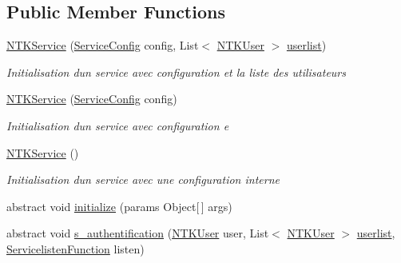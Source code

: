 \subsection*{Public Member Functions}
\begin{DoxyCompactItemize}
\item 
\mbox{\hyperlink{class_n_t_k_1_1_service_1_1_n_t_k_service_ae481738002a4ff9e84a28f900b077283}{N\+T\+K\+Service}} (\mbox{\hyperlink{struct_n_t_k_1_1_service_1_1_service_config}{Service\+Config}} config, List$<$ \mbox{\hyperlink{class_n_t_k_1_1_n_t_k_user}{N\+T\+K\+User}} $>$ \mbox{\hyperlink{class_n_t_k_1_1_service_1_1_n_t_k_service_a14977c798a805fea99802fa40da31aa0}{userlist}})
\begin{DoxyCompactList}\small\item\em Initialisation d\textquotesingle{}un service avec configuration et la liste des utilisateurs \end{DoxyCompactList}\item 
\mbox{\hyperlink{class_n_t_k_1_1_service_1_1_n_t_k_service_ab7f1a9e37216cfea00821caf98829436}{N\+T\+K\+Service}} (\mbox{\hyperlink{struct_n_t_k_1_1_service_1_1_service_config}{Service\+Config}} config)
\begin{DoxyCompactList}\small\item\em Initialisation d\textquotesingle{}un service avec configuration e \end{DoxyCompactList}\item 
\mbox{\hyperlink{class_n_t_k_1_1_service_1_1_n_t_k_service_ae68f898da08a9d9916b23c106474cae8}{N\+T\+K\+Service}} ()
\begin{DoxyCompactList}\small\item\em Initialisation d\textquotesingle{}un service avec une configuration interne \end{DoxyCompactList}\item 
abstract void \mbox{\hyperlink{class_n_t_k_1_1_service_1_1_n_t_k_service_a054248d5e9d86a488d81afe35043da94}{initialize}} (params Object\mbox{[}$\,$\mbox{]} args)
\item 
abstract void \mbox{\hyperlink{class_n_t_k_1_1_service_1_1_n_t_k_service_abab6261724876aea1ba1590720c2b994}{s\+\_\+authentification}} (\mbox{\hyperlink{class_n_t_k_1_1_n_t_k_user}{N\+T\+K\+User}} user, List$<$ \mbox{\hyperlink{class_n_t_k_1_1_n_t_k_user}{N\+T\+K\+User}} $>$ \mbox{\hyperlink{class_n_t_k_1_1_service_1_1_n_t_k_service_a14977c798a805fea99802fa40da31aa0}{userlist}}, \mbox{\hyperlink{namespace_n_t_k_1_1_service_a49f4581ae6fb3e9c155d034c47791db9}{Servicelisten\+Function}} listen)

\end{DoxyCompactItemize}
